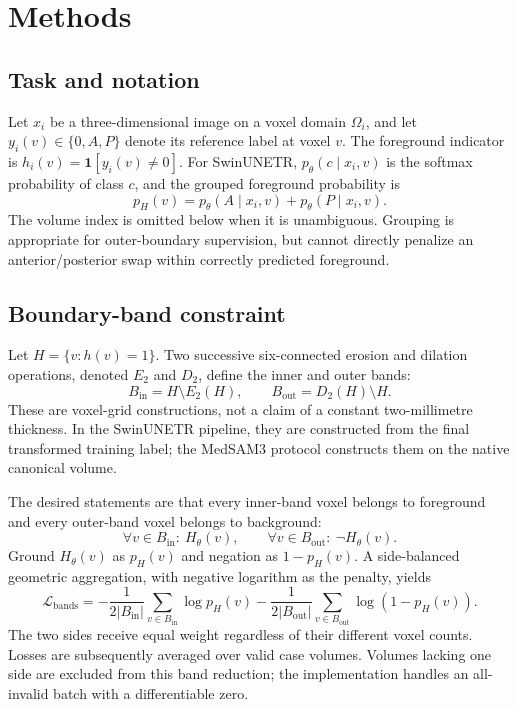 \section{Methods}\label{sec:methods}
\subsection{Task and notation}
Let $x_i$ be a three-dimensional image on a voxel domain $\Omega_i$, and let $y_i(v)\in\{0,A,P\}$ denote its reference label at voxel $v$. The foreground indicator is $h_i(v)=\mathbf{1}[y_i(v)\ne0]$. For SwinUNETR, $p_\theta(c\mid x_i,v)$ is the softmax probability of class $c$, and the grouped foreground probability is
\begin{equation}
p_H(v)=p_\theta(A\mid x_i,v)+p_\theta(P\mid x_i,v).
\end{equation}
The volume index is omitted below when it is unambiguous. Grouping is appropriate for outer-boundary supervision, but cannot directly penalize an anterior/posterior swap within correctly predicted foreground.

\subsection{Boundary-band constraint}
Let $H=\{v:h(v)=1\}$. Two successive six-connected erosion and dilation operations, denoted $E_2$ and $D_2$, define the inner and outer bands:
\begin{equation}
B_{\mathrm{in}}=H\setminus E_2(H),\qquad
B_{\mathrm{out}}=D_2(H)\setminus H.
\end{equation}
These are voxel-grid constructions, not a claim of a constant two-millimetre thickness. In the SwinUNETR pipeline, they are constructed from the final transformed training label; the MedSAM3 protocol constructs them on the native canonical volume.

The desired statements are that every inner-band voxel belongs to foreground and every outer-band voxel belongs to background:
\begin{equation}
\forall v\in B_{\mathrm{in}}:\ H_\theta(v),\qquad
\forall v\in B_{\mathrm{out}}:\ \neg H_\theta(v).
\end{equation}
Ground $H_\theta(v)$ as $p_H(v)$ and negation as $1-p_H(v)$. A side-balanced geometric aggregation, with negative logarithm as the penalty, yields
\begin{equation}\label{eq:bands}
\mathcal{L}_{\mathrm{bands}}=
-\frac{1}{2|B_{\mathrm{in}}|}\sum_{v\in B_{\mathrm{in}}}\log p_H(v)
-\frac{1}{2|B_{\mathrm{out}}|}\sum_{v\in B_{\mathrm{out}}}\log(1-p_H(v)).
\end{equation}
The two sides receive equal weight regardless of their different voxel counts. Losses are subsequently averaged over valid case volumes. Volumes lacking one side are excluded from this band reduction; the implementation handles an all-invalid batch with a differentiable zero.

